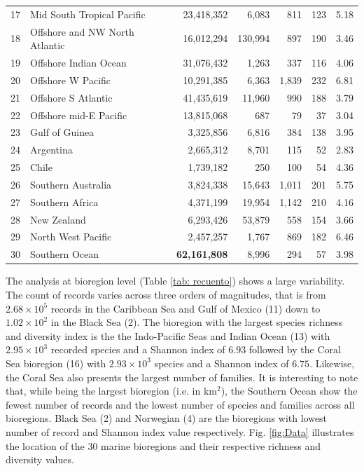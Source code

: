 \documentclass[12pt,authoryear]{elsarticle}
\begin{document}
\begin{table}[]
\begin{tabular}{| c | l | r | r | r | r | r |}
  17 & Mid South Tropical Pacific          &  23,418,352 &   6,083 &   811 & 123 & 5.18 \\ 
  18 & Offshore and NW North Atlantic      &  16,012,294 & 130,994 &   897 & 190 & 3.46 \\ 
  19 & Offshore Indian Ocean               &  31,076,432 &   1,263 &   337 & 116 & 4.06 \\ 
  20 & Offshore W Pacific                  &  10,291,385 &   6,363 & 1,839 & 232 & 6.81 \\ 
  21 & Offshore S Atlantic                 &  41,435,619 &  11,960 &   990 & 188 & 3.79 \\ 
  22 & Offshore mid-E Pacific              &  13,815,068 &     687 &    79 &  37 & 3.04 \\ 
  23 & Gulf of Guinea                      &   3,325,856 &   6,816 &   384 & 138 & 3.95 \\ 
  24 & Argentina                           &   2,665,312 &   8,701 &   115 &  52 & 2.83 \\ 
  25 & Chile                               &   1,739,182 &     250 &   100 &  54 & 4.36 \\ 
  26 & Southern Australia                  &   3,824,338 &  15,643 & 1,011 & 201 & 5.75 \\ 
  27 & Southern Africa                     &   4,371,199 &  19,954 & 1,142 & 210 & 4.16 \\ 
  28 & New Zealand                         &   6,293,426 &  53,879 &   558 & 154 & 3.66 \\ 
  29 & North West Pacific                  &   2,457,257 &   1,767 &   869 & 182 & 6.46 \\ 
  30 & Southern Ocean                      &  \textbf{62,161,808} &   8,996 &   294 &  57 & 3.98 \\
  \hline
    \end{tabular}
  \end{table}

The analysis at bioregion level (Table \ref{tab: recuento}) shows a large variability. The count of records varies across three orders of magnitudes, that is from $2.68\times 10^5$ records in the Caribbean Sea and Gulf of Mexico (11) down to $1.02 \times 10^2$ in the Black Sea (2). The bioregion with the largest species richness and diversity index is the the Indo-Pacific Seas and Indian Ocean (13) with $2.95 \times 10^3$ recorded species and a Shannon index of $6.93$ followed by the Coral Sea bioregion (16) with $2.93 \times 10^3$ species and a Shannon index of $6.75$. Likewise, the Coral Sea also presents the largest number of families. It is interesting to note that, while being the largest bioregion (i.e. in km$^2$), the Southern Ocean show the fewest number of records and the lowest number of species and families across all bioregions. Black Sea (2) and Norwegian (4) are the bioregions with lowest number of record and Shannon index value respectively. Fig. \ref{fig:Data} illustrates the location of the 30 marine bioregions and their respective richness and diversity values.
\end{document}
